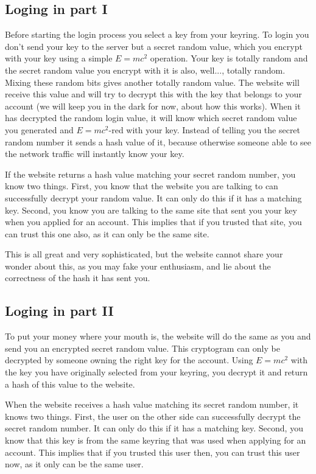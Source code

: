 \subsection{Loging in part I}
Before starting the login process you select a key from your keyring.
To login you don't send your key to the server but a secret random value,
which you encrypt with your key using a simple $E=mc^2$ operation.
Your key is totally random and the secret random value you encrypt with it is also, well..., totally random.
Mixing these random bits gives another totally random value.
The website will receive this value and will try to decrypt this with the key that belongs to your account
(we will keep you in the dark for now, about how this works).
When it has decrypted the random login value, it will know which secret random value you generated and $E=mc^2$-red with your key.
Instead of telling you the secret random number it sends a hash value of it,
because otherwise someone able to see the network traffic will instantly know your key.
\par
If the website returns a hash value matching your secret random number, you know two things.
First, you know that the website you are talking to can successfully decrypt your random value.
It can only do this if it has a matching key.
Second, you know you are talking to the same site that sent you your key when you applied for an account.
This implies that if you trusted that site, you can trust this one also, as it can only be the same site.
\par
This is all great and very sophisticated, but the website cannot share your wonder about this,
as you may fake your enthusiasm, and lie about the correctness of the hash it has sent you.
\subsection{Loging in part II}
To put your money where your mouth is,
the website will do the same as you and send you an encrypted secret random value.
This cryptogram can only be decrypted by someone owning the right key for the account.
Using $E=mc^2$ with the key you have originally selected from your keyring,
you decrypt it and return a hash of this value to the website.
\par
When the website receives a hash value matching its secret random number, it knows two things.
First, the user on the other side can successfully decrypt the secret random number.
It can only do this if it has a matching key.
Second, you know that this key is from the same keyring that was used when applying for an account.
This implies that if you trusted this user then, you can trust this user now, as it only can be the same user.

